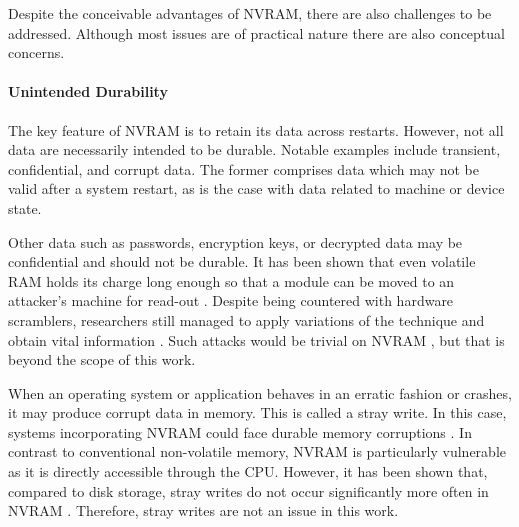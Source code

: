 Despite the conceivable advantages of \ac{NVRAM}, there are also challenges to
be addressed. Although most issues are of practical nature there are also
conceptual concerns.

\paragraph{Unintended Durability}

The key feature of \ac{NVRAM} is to retain its data across restarts. However,
not all data are necessarily intended to be durable. Notable examples include
transient, confidential, and corrupt data. The former comprises data which may
not be valid after a system restart, as is the case with data related to machine
or device state.

Other data such as passwords, encryption keys, or decrypted data may be
confidential and should not be durable. It has been shown that even volatile
\ac{RAM} holds its charge long enough so that a module can be moved to an
attacker's machine for read-out \cite{halderman2008lest}. Despite being
countered with hardware scramblers, researchers still managed to apply
variations of the technique and obtain vital information
\cite{yitbarek2017cold}. Such attacks would be trivial on \ac{NVRAM}
\cite{bailey2011operating}, but that is beyond the scope of this work.


When an operating system or application behaves in an erratic fashion or
crashes, it may produce corrupt data in memory. This is called a stray write. In
this case, systems incorporating \ac{NVRAM} could face durable memory
corruptions \cite{condit2009better, venkataraman2011consistent}. In contrast to
conventional non-volatile memory, \ac{NVRAM} is particularly vulnerable as it is
directly accessible through the \ac{CPU}. However, it has been shown that,
compared to disk storage, stray writes do not occur significantly more often in
\ac{NVRAM} \cite{chen1996rio}. Therefore, stray writes are not an issue in this
work.

